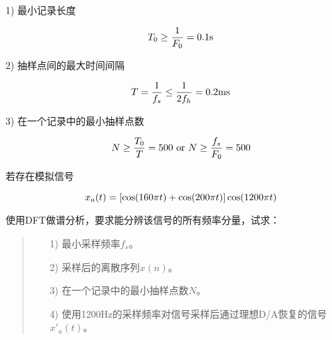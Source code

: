 \documentclass[cn, hazy, blue, normal, 12pt]{elegantnote}
\begin{document}
\begin{solution}[print=true]
    
1) 最小记录长度

\begin{equation}
    \notag
    T_0\geq\frac{1}{F_0}=0.1\text{s}
\end{equation}

2) 抽样点间的最大时间间隔

\begin{equation}
    \notag
    T=\frac{1}{f_s}\leq\frac{1}{2f_h}=0.2\text{ms}
\end{equation}

3) 在一个记录中的最小抽样点数

\begin{equation}
    \notag
    N\geq\frac{T_0}{T}=500 \text{ or } N\geq\frac{f_s}{F_0}=500
\end{equation}

\end{solution}

\begin{exercise}

若存在模拟信号

\begin{equation}
\notag
    x_a(t)=[\cos(160\pi t)+\cos(200\pi t)]\cos(1200\pi t)
\end{equation}

使用DFT做谱分析，要求能分辨该信号的所有频率分量，试求：

\begin{quote}
\begin{itemize}
    \item[1)] 最小采样频率$f_s$。
    \item[2)] 采样后的离散序列$x(n)$。
    \item[3)] 在一个记录中的最小抽样点数$N$。
    \item[4)] 使用1200Hz的采样频率对信号采样后通过理想D/A恢复的信号$x'_a(t)$。
\end{itemize}
\end{quote}

\end{exercise}
\end{document}
